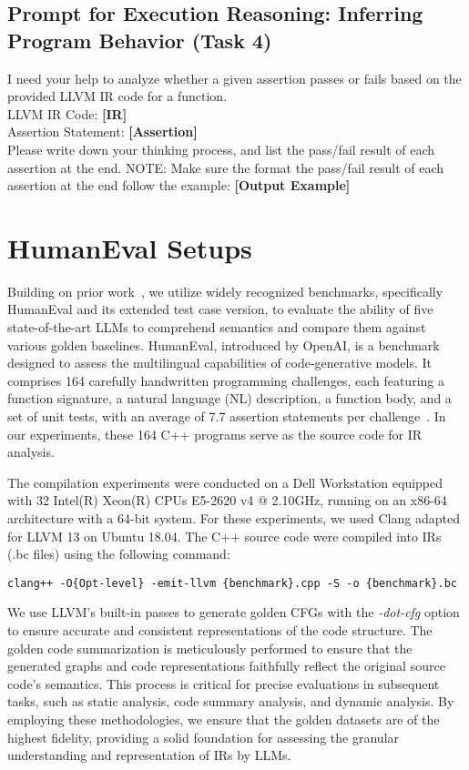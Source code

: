\subsection{Prompt for Execution Reasoning: Inferring Program Behavior
(Task 4)}
\begin{prompt}
      I need your help to analyze whether a given assertion passes or fails based on the provided LLVM IR code for a function.\\
  LLVM IR Code:\textbf{ [IR]}\\
  Assertion Statement: \textbf{[Assertion]}\\
Please write down your thinking process, and list the pass/fail result of each assertion at the end.
NOTE: Make sure the format the pass/fail result of each assertion at the end follow the example:
            \textbf{[Output Example]}
\end{prompt}


\section{HumanEval Setups}
Building on prior work~\cite{zheng2023codegeex, tan2024llm4decompile}, we utilize widely recognized benchmarks, specifically HumanEval and its extended test case version, to evaluate the ability of five state-of-the-art LLMs to comprehend semantics and compare them against various golden baselines. HumanEval, introduced by OpenAI, is a benchmark designed to assess the multilingual capabilities of code-generative models. It comprises 164 carefully handwritten programming challenges, each featuring a function signature, a natural language (NL) description, a function body, and a set of unit tests, with an average of 7.7 assertion statements per challenge~\cite{HuamanEval2021}. In our experiments, these 164 C++ programs serve as the source code for IR analysis.

The compilation experiments were conducted on a Dell Workstation equipped with 32 Intel(R) Xeon(R) CPUs E5-2620 v4 @ 2.10GHz, running on an x86-64 architecture with a 64-bit system. For these experiments, we used Clang adapted for LLVM 13 on Ubuntu 18.04. The C++ source code were compiled into IRs (.bc files) using the following command: 
\begin{center} \texttt{clang++ -O\{Opt-level\} -emit-llvm \{benchmark\}.cpp -S -o \{benchmark\}.bc} \end{center}

We use LLVM's built-in passes to generate golden CFGs with the \textit{-dot-cfg} option to ensure accurate and consistent representations of the code structure. The golden code summarization is meticulously performed to ensure that the generated graphs and code representations faithfully reflect the original source code's semantics. This process is critical for precise evaluations in subsequent tasks, such as static analysis, code summary analysis, and dynamic analysis. By employing these methodologies, we ensure that the golden datasets are of the highest fidelity, providing a solid foundation for assessing the granular understanding and representation of IRs by LLMs. 
